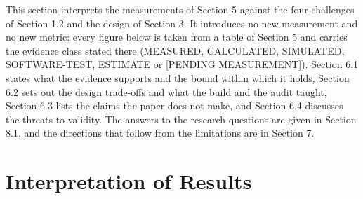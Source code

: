 This section interprets the measurements of Section 5 against the four challenges of Section 1.2 and the design of Section 3. It introduces no new measurement and no new metric: every figure below is taken from a table of Section 5 and carries the evidence class stated there (MEASURED, CALCULATED, SIMULATED, SOFTWARE-TEST, ESTIMATE or [PENDING MEASUREMENT]). Section 6.1 states what the evidence supports and the bound within which it holds, Section 6.2 sets out the design trade-offs and what the build and the audit taught, Section 6.3 lists the claims the paper does not make, and Section 6.4 discusses the threats to validity. The answers to the research questions are given in Section 8.1, and the directions that follow from the limitations are in Section 7.

\section{Interpretation of Results}

